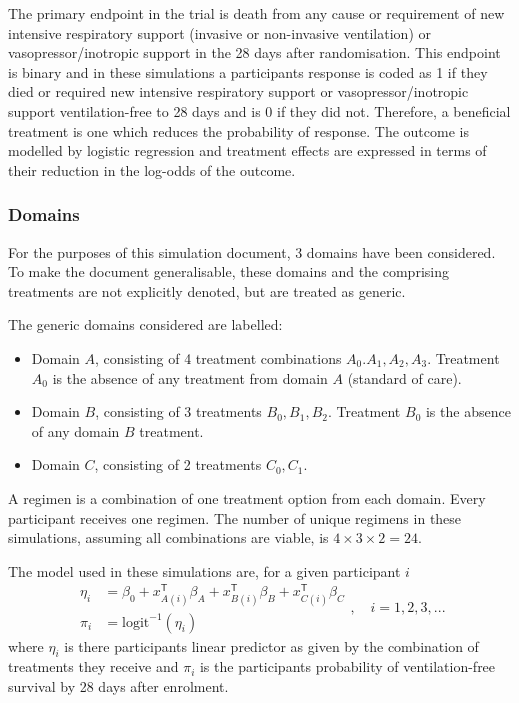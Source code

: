 \documentclass[
]{article}
\providecommand{\tightlist}{%
  \setlength{\itemsep}{0pt}\setlength{\parskip}{0pt}}
\begin{document}
The primary endpoint in the trial is death from any cause or requirement of new intensive respiratory support (invasive or non-invasive ventilation) or vasopressor/inotropic support in the 28 days after randomisation.
This endpoint is binary and in these simulations a participants response is coded as 1 if they died or required new intensive respiratory support or vasopressor/inotropic support ventilation-free to 28 days and is 0 if they did not.
Therefore, a beneficial treatment is one which reduces the probability of response.
The outcome is modelled by logistic regression and treatment effects are expressed in terms of their reduction in the log-odds of the outcome.

\hypertarget{domains}{%
\subsubsection{Domains}\label{domains}}

For the purposes of this simulation document, 3 domains have been considered.
To make the document generalisable, these domains and the comprising treatments are not explicitly denoted, but are treated as generic.

The generic domains considered are labelled:

\begin{itemize}
\tightlist
\item
  Domain \(A\), consisting of 4 treatment combinations \(A_0.A_1,A_2,A_3\). Treatment \(A_0\) is the absence of any treatment from domain \(A\) (standard of care).
\item
  Domain \(B\), consisting of 3 treatments \(B_0,B_1,B_2\). Treatment \(B_0\) is the absence of any domain \(B\) treatment.
\item
  Domain \(C\), consisting of 2 treatments \(C_0,C_1\).
\end{itemize}

A regimen is a combination of one treatment option from each domain.
Every participant receives one regimen.
The number of unique regimens in these simulations, assuming all combinations are viable, is \(4\times 3\times 2=24\).

The model used in these simulations are, for a given participant \(i\)
\[
\begin{aligned}
\eta_i &= \beta_0 + x_{A(i)}^{\mathsf{T}}\beta_A + x_{B(i)}^{\mathsf{T}}\beta_B + x_{C(i)}^{\mathsf{T}}\beta_C \\
\pi_i &= \text{logit}^{-1}(\eta_i)
\end{aligned}, \quad i=1,2,3,...
\]
where \(\eta_i\) is there participants linear predictor as given by the combination of treatments they receive and \(\pi_i\) is the participants probability of ventilation-free survival by 28 days after enrolment.
\end{document}
